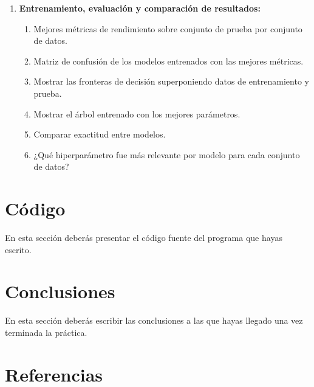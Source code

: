 \documentclass{article}
\begin{document}
\begin{enumerate}
\begin{enumerate}
    \end{enumerate}
     \item \textbf{Entrenamiento, evaluación y comparación de resultados: }
    \begin{enumerate}
      \item Mejores métricas de rendimiento sobre conjunto de prueba por conjunto de datos.
      \item Matriz de confusión de los modelos entrenados con las mejores métricas.
      \item Mostrar las fronteras de decisión superponiendo datos de entrenamiento y prueba.
      \item Mostrar el árbol entrenado con los mejores parámetros.
      \item Comparar exactitud entre modelos.
      \item ¿Qué hiperparámetro fue más relevante por modelo para cada conjunto de datos?
    \end{enumerate}

    

\end{enumerate}

\bigskip



\section{Código}
En esta sección deberás presentar el código fuente del programa que hayas escrito.
\section{Conclusiones}
En esta sección deberás escribir las conclusiones a las que hayas llegado una vez terminada la práctica.
\section{Referencias}
\end{document}
